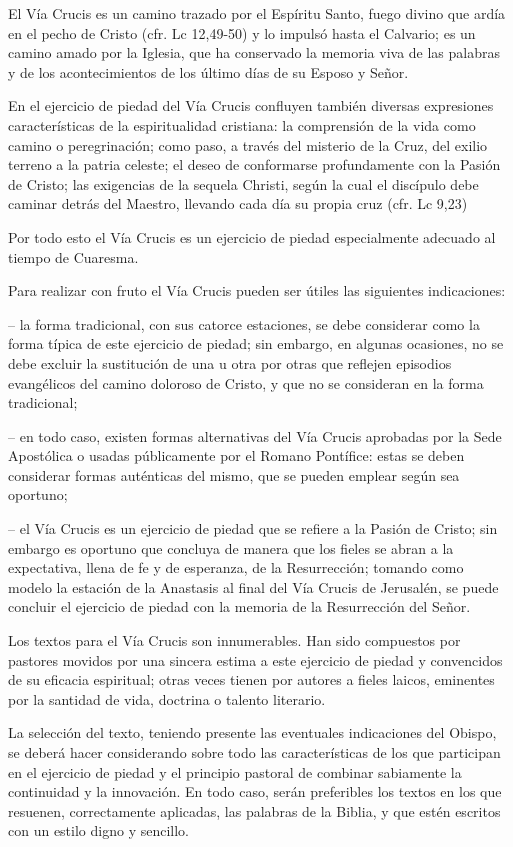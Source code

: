 \begin{introstyle}
El Vía Crucis es un camino trazado por el Espíritu Santo, fuego divino que ardía en el pecho de Cristo (cfr. Lc 12,49-50) y lo impulsó hasta el Calvario; es un camino amado por la Iglesia, que ha conservado la memoria viva de las palabras y de los acontecimientos de los último días de su Esposo y Señor.

En el ejercicio de piedad del Vía Crucis confluyen también diversas expresiones características de la espiritualidad cristiana: la comprensión de la vida como camino o peregrinación; como paso, a través del misterio de la Cruz, del exilio terreno a la patria celeste; el deseo de conformarse profundamente con la Pasión de Cristo; las exigencias de la sequela Christi, según la cual el discípulo debe caminar detrás del Maestro, llevando cada día su propia cruz (cfr. Lc 9,23)

Por todo esto el Vía Crucis es un ejercicio de piedad especialmente adecuado al tiempo de Cuaresma.

Para realizar con fruto el Vía Crucis pueden ser útiles las siguientes indicaciones:

– la forma tradicional, con sus catorce estaciones, se debe considerar como la forma típica de este ejercicio de piedad; sin embargo, en algunas ocasiones, no se debe excluir la sustitución de una u otra  por otras que reflejen episodios evangélicos del camino doloroso de Cristo, y que no se consideran en la forma tradicional;

– en todo caso, existen formas alternativas del Vía Crucis aprobadas por la Sede Apostólica o usadas públicamente por el Romano Pontífice: estas se deben considerar formas auténticas del mismo, que se pueden emplear según sea oportuno;

– el Vía Crucis es un ejercicio de piedad que se refiere a la Pasión de Cristo; sin embargo es oportuno que concluya de manera que los fieles se abran a la expectativa, llena de fe y de esperanza, de la Resurrección; tomando como modelo la estación de la Anastasis al final del Vía Crucis de Jerusalén, se puede concluir el ejercicio de piedad con la memoria de la Resurrección del Señor.

Los textos para el Vía Crucis son innumerables. Han sido compuestos por pastores movidos por una sincera estima a este ejercicio de piedad y convencidos de su eficacia espiritual; otras veces tienen por autores a fieles laicos, eminentes por la santidad de vida, doctrina o talento literario.

La selección del texto, teniendo presente las eventuales indicaciones del Obispo, se deberá hacer considerando sobre todo las características de los que participan en el ejercicio de piedad y el principio pastoral de combinar sabiamente la continuidad y la innovación. En todo caso, serán preferibles los textos en los que resuenen, correctamente aplicadas, las palabras de la Biblia, y que estén escritos con un estilo digno y sencillo.


\end{introstyle}
